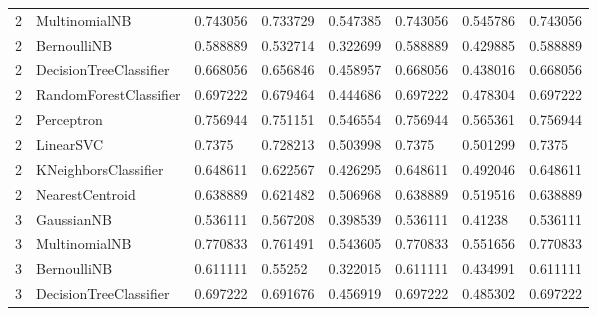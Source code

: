\documentclass{article}
\begin{document}
\begin{table}[h]
\begin{tabular}{llllllll}
2             & MultinomialNB          & 0.743056          & 0.733729          & 0.547385              & 0.743056              & 0.545786                 & 0.743056                 \\
2             & BernoulliNB            & 0.588889          & 0.532714          & 0.322699              & 0.588889              & 0.429885                 & 0.588889                 \\
2             & DecisionTreeClassifier & 0.668056          & 0.656846          & 0.458957              & 0.668056              & 0.438016                 & 0.668056                 \\
2             & RandomForestClassifier & 0.697222          & 0.679464          & 0.444686              & 0.697222              & 0.478304                 & 0.697222                 \\
2             & Perceptron             & 0.756944          & 0.751151          & 0.546554              & 0.756944              & 0.565361                 & 0.756944                 \\
2             & LinearSVC              & 0.7375            & 0.728213          & 0.503998              & 0.7375                & 0.501299                 & 0.7375                   \\
2             & KNeighborsClassifier   & 0.648611          & 0.622567          & 0.426295              & 0.648611              & 0.492046                 & 0.648611                 \\
2             & NearestCentroid        & 0.638889          & 0.621482          & 0.506968              & 0.638889              & 0.519516                 & 0.638889                 \\
3             & GaussianNB             & 0.536111          & 0.567208          & 0.398539              & 0.536111              & 0.41238                  & 0.536111                 \\
3             & MultinomialNB          & 0.770833          & 0.761491          & 0.543605              & 0.770833              & 0.551656                 & 0.770833                 \\
3             & BernoulliNB            & 0.611111          & 0.55252           & 0.322015              & 0.611111              & 0.434991                 & 0.611111                 \\
3             & DecisionTreeClassifier & 0.697222          & 0.691676          & 0.456919              & 0.697222              & 0.485302                 & 0.697222                 \\

\end{tabular}
\end{table}
\end{document}
